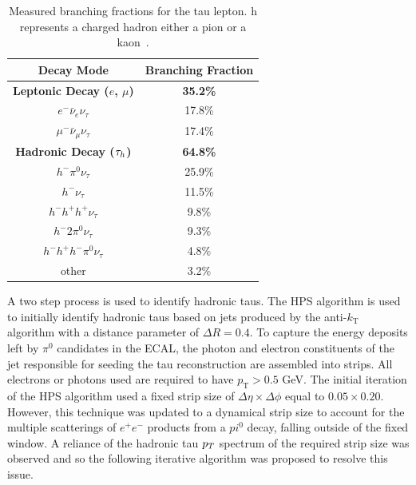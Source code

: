 \begin{table}[h]
    \centering
    \begin{tabular}{|c|c|}
         \hline
         Decay Mode & Branching Fraction  \\
         \hline
         \hline
         \textbf{Leptonic Decay ($e$, $\mu$)} & \textbf{35.2\%} \\
         $e^- \bar{\nu}_e \nu_\tau $ & 17.8\% \\
         $\mu^- \bar{\nu}_\mu \nu_\tau $ & 17.4\% \\
         \hline
         \textbf{Hadronic Decay ($\tau_{h}$)} & \textbf{64.8\%} \\
         $h^- \pi^0 \nu_\tau $ & 25.9\% \\
         $h^- \nu_\tau$ & 11.5\% \\
         $h^- h^+ h^+ \nu_\tau$ & 9.8\% \\
         $h^- 2\pi^0 \nu_\tau$ & 9.3\% \\
         $h^- h^+ h^- \pi^0 \nu_\tau$ & 4.8\% \\
         other & 3.2\% \\
         \hline
    \end{tabular}
    \caption{Measured branching fractions for the tau lepton. h represents a charged hadron either a pion or a kaon~\cite{ParticleDataGroup:2022pth}.}
    \label{tab:tau_decay}
\end{table}

A two step process is used to identify hadronic taus.
The \ac{HPS} algorithm is used to initially identify hadronic taus based on jets produced by the anti-$k_{\text{T}}$ algorithm with a distance parameter of $\Delta R = 0.4$. 
To capture the energy deposits left by $\pi^0$ candidates in the ECAL, the photon and electron constituents of the jet responsible for seeding the tau reconstruction are assembled into strips. 
All electrons or photons used are required to have $p_{\text{T}} > 0.5$ GeV.
The initial iteration of the \ac{HPS} algorithm used a fixed strip size of $\Delta \eta \times \Delta \phi$ equal to $0.05 \times 0.20$.
However, this technique was updated to a dynamical strip size to account for the multiple scatterings of $e^+ e^-$ products from a $pi^0$ decay, falling outside of the fixed window.
A reliance of the hadronic tau $p_{T}$ spectrum of the required strip size was observed and so the following iterative algorithm was proposed to resolve this issue.

